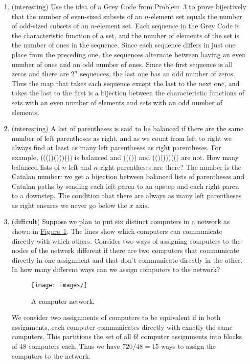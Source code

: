 \documentclass[10pt,]{book}
\theoremstyle{plain}
\theoremstyle{definition}
\numberwithin{equation}{chapter}
\begin{document}
\begin{enumerate}
%
\item\hypertarget{li-4}{}(interesting) Use the idea of a Grey Code from \hyperlink{GreyCode}{Problem~3} to prove bijectively that the number of even-sized subsets of an \(n\)-element set equals the number of odd-sized subsets of an \(n\)-element set. Each sequence in the Grey Code is the characteristic function of a set, and the number of elements of the set is the number of ones in the sequence. Since each sequence differs in just one place from the preceding one, the sequences alternate between having an even number of ones and an odd number of ones. Since the first sequence is all zeros and there are \(2^n\) sequences, the last one has an odd number of zeros. Thus the map that takes each sequence except the last to the next one, and takes the last to the first is a bijection between the characteristic functions of sets with an even number of elements and sets with an odd number of elements.%
%
\item\hypertarget{li-5}{}(interesting) A list of parentheses is said to be balanced if there are the same number of left parentheses as right, and as we count from left to right we always find at least as many left parentheses as right parentheses.  For example, (((()()))()) is balanced and ((()) and (()()))(() are not.  How many balanced lists of \(n\) left and \(n\)  right parentheses are there? The number is the Catalan number: we get a bijection between balanced lists of parentheses and Catalan paths by sending each left paren to an upstep and each right paren to a downstep. The condition that there are always as many left parentheses as right ensures we never go below the \(x\) axis.%
%
\item\hypertarget{li-6}{}(difficult) Suppose we plan to put six distinct computers in a network as shown in \hyperref[hexagonalnetwork]{Figure~\ref{hexagonalnetwork}}.  The lines show which computers can communicate directly with which others.  Consider two ways of assigning computers to the nodes of the network different if there are two computers that communicate directly in one assignment and that don't communicate directly in the other.  In how many different ways can we assign computers to the network? \begin{figure}
\centering
\texttt{[image: images/]}
\caption{A computer network.\label{hexagonalnetwork}}
\end{figure}
 We consider two assignments of computers to be equivalent if in both assignments, each computer communicates directly with exactly the same computers. This partitions the set of all \(6!\) computer assignments into blocks of \(48\) computers each. Thus we have \(720/48=15\) ways to assign the computers to the network.%

\end{enumerate}
\end{document}
